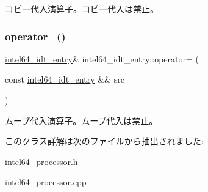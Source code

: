 コピー代入演算子。コピー代入は禁止。 \hypertarget{classintel64__idt__entry_a8f06154d5008db370f39a63600ed71a7}{}\label{classintel64__idt__entry_a8f06154d5008db370f39a63600ed71a7} 
\subsubsection{\texorpdfstring{operator=()}{operator=()}\hspace{0.1cm}{\footnotesize\ttfamily [2/2]}}
{\footnotesize\ttfamily \hyperlink{classintel64__idt__entry}{intel64\+\_\+idt\+\_\+entry}\& intel64\+\_\+idt\+\_\+entry\+::operator= (\begin{DoxyParamCaption}\item[{const \hyperlink{classintel64__idt__entry}{intel64\+\_\+idt\+\_\+entry} \&\&}]{src }\end{DoxyParamCaption})\hspace{0.3cm}{\ttfamily [delete]}}

ムーブ代入演算子。ムーブ代入は禁止。 

このクラス詳解は次のファイルから抽出されました\+:\begin{DoxyCompactItemize}
\item 
\hyperlink{intel64__processor_8h}{intel64\+\_\+processor.\+h}\item 
\hyperlink{intel64__processor_8cpp}{intel64\+\_\+processor.\+cpp}\end{DoxyCompactItemize}
